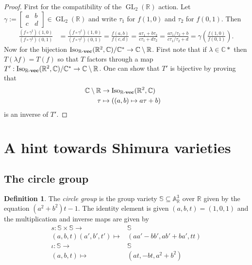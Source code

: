 \documentclass[a4paper,12pt,reqno]{amsart}
\newcommand{\field}[1]{\mathbb{#1}}  %
\newcommand{\R}{\field{R}} %
\newcommand{\C}{\field{C}} %
\newcommand{\A}{\field{A}}
\renewcommand{\SS}{\field{S}}
\newcommand{\IsoKVec}[1]{\mathrm{Iso}_{#1 {\bf\text{-}vec}}}
\newcommand{\transpose}{t}
\DeclareMathOperator{\GL}{GL}
\theoremstyle{definition}
\newtheorem{definition}[lemma]{Definition}
\numberwithin{lemma}{section}
\numberwithin{equation}{section}
\numberwithin{figure}{section}
\begin{document}
\begin{proof}
First for the compatibility of the $\GL_2(\R)$ action. Let $\gamma := \left [\begin{smallmatrix}
a & b \\ 
c & d
\end{smallmatrix}\right] \in \GL_2(\R)$ and write $\tau_1$ for $f(1,0)$ and $\tau_2$ for $f(0,1)$. Then
\begin{align*}
\frac {(f \circ \gamma^\transpose) (1,0)} {(f \circ \gamma^\transpose) (0,1)} &= \frac {(f \circ \gamma^\transpose) (1,0)} {(f \circ \gamma^\transpose) (0,1)}  =\frac {f(a,b)} {f(c,d)}  = \frac{a\tau_1+b\tau_2}{c\tau_1 + d\tau_2} =  \frac{a\tau_1/\tau_2+b}{c\tau_1/\tau_2 + d} = \gamma\left(\frac {f (1,0)} {f (0,1)}\right).
\end{align*}
Now for the bijection $\IsoKVec{\R}(\R^2,\C)/\C^* \to \C \setminus \R$. First note that if $\lambda \in \C*$ then $T(\lambda f) = T(f)$ so that $T$ factors through a map $T' : \IsoKVec{\R}(\R^2,\C)/\C^*  \to \C \setminus \R$. One can show that $T'$ is bijective by proving that 
\begin{align*}\C \setminus \R &\to \IsoKVec{\R}(\R^2,\C) & \\
\tau &\mapsto ((a,b) \mapsto a\tau +b)
\end{align*}
is an inverse of $T'$.
\end{proof}



\section{A hint towards Shimura varieties}

\subsection{The circle group}

\begin{definition}
	The \textit{circle group} is the group variety $\SS \subseteq \A^3_\R$ over $\R$ given by the equation $(a^2+b^2)t-1$. The identity element is given $(a,b,t)=(1,0,1)$ and the multiplication and inverse maps are given by
	\begin{align*}
	 s : \SS \times \SS \to& \SS \\
	   (a,b,t)(a',b',t') \mapsto& (aa'-bb',ab'+ba', tt) \\
	 \iota : \SS \to & \SS\\
	           (a,b,t) \mapsto& (at,-bt,a^2+b^2)
	\end{align*} 
\end{definition}
\end{document}
